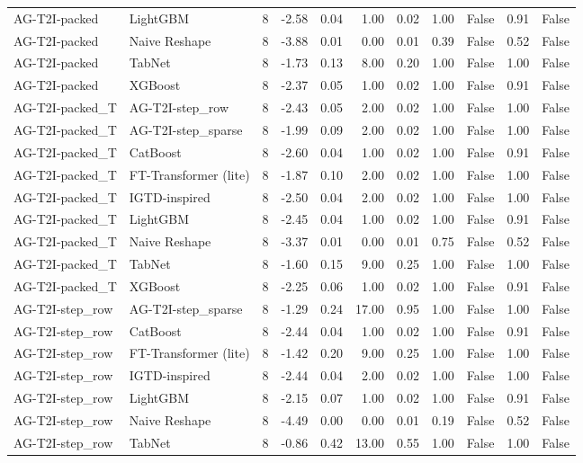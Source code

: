 \begin{tabular}{llrrrrrrlrl}
AG-T2I-packed & LightGBM & 8 & -2.58 & 0.04 & 1.00 & 0.02 & 1.00 & False & 0.91 & False \\
AG-T2I-packed & Naive Reshape & 8 & -3.88 & 0.01 & 0.00 & 0.01 & 0.39 & False & 0.52 & False \\
AG-T2I-packed & TabNet & 8 & -1.73 & 0.13 & 8.00 & 0.20 & 1.00 & False & 1.00 & False \\
AG-T2I-packed & XGBoost & 8 & -2.37 & 0.05 & 1.00 & 0.02 & 1.00 & False & 0.91 & False \\
AG-T2I-packed_T & AG-T2I-step_row & 8 & -2.43 & 0.05 & 2.00 & 0.02 & 1.00 & False & 1.00 & False \\
AG-T2I-packed_T & AG-T2I-step_sparse & 8 & -1.99 & 0.09 & 2.00 & 0.02 & 1.00 & False & 1.00 & False \\
AG-T2I-packed_T & CatBoost & 8 & -2.60 & 0.04 & 1.00 & 0.02 & 1.00 & False & 0.91 & False \\
AG-T2I-packed_T & FT-Transformer (lite) & 8 & -1.87 & 0.10 & 2.00 & 0.02 & 1.00 & False & 1.00 & False \\
AG-T2I-packed_T & IGTD-inspired & 8 & -2.50 & 0.04 & 2.00 & 0.02 & 1.00 & False & 1.00 & False \\
AG-T2I-packed_T & LightGBM & 8 & -2.45 & 0.04 & 1.00 & 0.02 & 1.00 & False & 0.91 & False \\
AG-T2I-packed_T & Naive Reshape & 8 & -3.37 & 0.01 & 0.00 & 0.01 & 0.75 & False & 0.52 & False \\
AG-T2I-packed_T & TabNet & 8 & -1.60 & 0.15 & 9.00 & 0.25 & 1.00 & False & 1.00 & False \\
AG-T2I-packed_T & XGBoost & 8 & -2.25 & 0.06 & 1.00 & 0.02 & 1.00 & False & 0.91 & False \\
AG-T2I-step_row & AG-T2I-step_sparse & 8 & -1.29 & 0.24 & 17.00 & 0.95 & 1.00 & False & 1.00 & False \\
AG-T2I-step_row & CatBoost & 8 & -2.44 & 0.04 & 1.00 & 0.02 & 1.00 & False & 0.91 & False \\
AG-T2I-step_row & FT-Transformer (lite) & 8 & -1.42 & 0.20 & 9.00 & 0.25 & 1.00 & False & 1.00 & False \\
AG-T2I-step_row & IGTD-inspired & 8 & -2.44 & 0.04 & 2.00 & 0.02 & 1.00 & False & 1.00 & False \\
AG-T2I-step_row & LightGBM & 8 & -2.15 & 0.07 & 1.00 & 0.02 & 1.00 & False & 0.91 & False \\
AG-T2I-step_row & Naive Reshape & 8 & -4.49 & 0.00 & 0.00 & 0.01 & 0.19 & False & 0.52 & False \\
AG-T2I-step_row & TabNet & 8 & -0.86 & 0.42 & 13.00 & 0.55 & 1.00 & False & 1.00 & False \\

\end{tabular}
